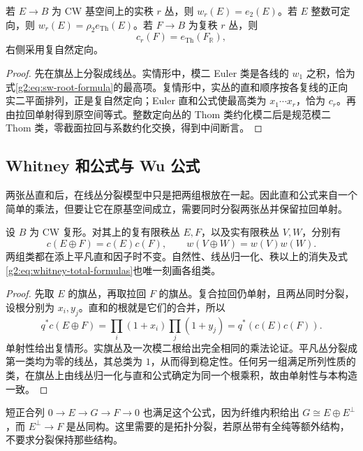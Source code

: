 \begin{theorem}\label{g2:thm:top-class-euler}
	若 \(E\to B\) 为 CW 基空间上的实秩 \(r\) 丛，则 \(w_r(E)=e_2(E)\)。若 \(E\) 整数可定向，则 \(w_r(E)=\rho_2 e_{\mathrm{Th}}(E)\)。若 \(F\to B\) 为复秩 \(r\) 丛，则
	\[
		c_r(F)=e_{\mathrm{Th}}(F_{\mathbb R}),
	\]
	右侧采用复自然定向。
\end{theorem}
\begin{proof}
	先在旗丛上分裂成线丛。实情形中，模二 Euler 类是各线的 \(w_1\) 之积，恰为式\eqref{g2:eq:sw-root-formula}的最高项。复情形中，实丛的直和顺序按各复线的正向实二平面排列，正是复自然定向；Euler 直和公式使最高类为 \(x_1\cdots x_r\)，恰为 \(c_r\)。再由拉回单射得到原空间等式。整数定向丛的 Thom 类约化模二后是规范模二 Thom 类，零截面拉回与系数约化交换，得到中间断言。
\end{proof}

\subsection{Whitney 和公式与 Wu 公式}
\label{g2:subsec:2103:03}
两张丛直和后，在线丛分裂模型中只是把两组根放在一起。因此直和公式来自一个简单的乘法，但要让它在原基空间成立，需要同时分裂两张丛并保留拉回单射。

\begin{theorem}\label{g2:thm:whitney-sum}
	设 \(B\) 为 CW 复形。对其上的复有限秩丛 \(E,F\)，以及实有限秩丛 \(V,W\)，分别有
	\begin{equation}\label{g2:eq:whitney-total-formulas}
		c(E\oplus F)=c(E)c(F),\qquad w(V\oplus W)=w(V)w(W).
	\end{equation}
	两组类都在添上平凡直和因子时不变。自然性、线丛归一化、秩以上的消失及式\eqref{g2:eq:whitney-total-formulas}也唯一刻画各组类。
\end{theorem}
\begin{proof}
	先取 \(E\) 的旗丛，再取拉回 \(F\) 的旗丛。复合拉回仍单射，且两丛同时分裂，设根分别为 \(x_i,y_j\)。直和的根就是它们的合并，所以
	\[
		q^*c(E\oplus F)=\prod_i(1+x_i)\prod_j(1+y_j)
		=q^*(c(E)c(F)).
	\]
	单射性给出复情形。实旗丛及一次模二根给出完全相同的乘法论证。平凡丛分裂成第一类均为零的线丛，其总类为 \(1\)，从而得到稳定性。任何另一组满足所列性质的类，在旗丛上由线丛归一化与直和公式确定为同一个根乘积，故由单射性与本构造一致。
\end{proof}

短正合列 \(0\to E\to G\to F\to0\) 也满足这个公式，因为纤维内积给出 \(G\cong E\oplus E^\perp\)，而 \(E^\perp\to F\) 是丛同构。这里需要的是拓扑分裂，若原丛带有全纯等额外结构，不要求分裂保持那些结构。

